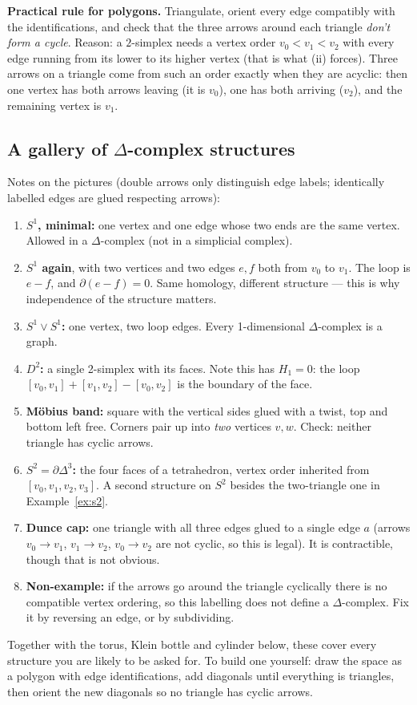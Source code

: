 \documentclass[11pt]{article}
\newcommand{\fig}[2]{\begin{center}\resizebox{#2}{!}{}\end{center}}
\theoremstyle{definition}
\begin{document}
\textbf{Practical rule for polygons.} Triangulate, orient every edge compatibly with the identifications, and check that the three arrows around each triangle \emph{don't form a cycle}. Reason: a $2$-simplex needs a vertex order $v_0<v_1<v_2$ with every edge running from its lower to its higher vertex (that is what (ii) forces). Three arrows on a triangle come from such an order exactly when they are acyclic: then one vertex has both arrows leaving (it is $v_0$), one has both arriving ($v_2$), and the remaining vertex is $v_1$.

\subsection{A gallery of $\Delta$-complex structures}
\fig{delta-gallery}{\textwidth}
Notes on the pictures (double arrows only distinguish edge labels; identically labelled edges are glued respecting arrows):
\begin{enumerate}
\item \textbf{$S^1$, minimal:} one vertex and one edge whose two ends are the same vertex. Allowed in a $\Delta$-complex (not in a simplicial complex).
\item \textbf{$S^1$ again}, with two vertices and two edges $e,f$ both from $v_0$ to $v_1$. The loop is $e-f$, and $\partial(e-f)=0$. Same homology, different structure --- this is why independence of the structure matters.
\item \textbf{$S^1\vee S^1$:} one vertex, two loop edges. Every 1-dimensional $\Delta$-complex is a graph.
\item \textbf{$D^2$:} a single 2-simplex with its faces. Note this has $H_1=0$: the loop $[v_0,v_1]+[v_1,v_2]-[v_0,v_2]$ is the boundary of the face.
\item \textbf{Möbius band:} square with the vertical sides glued with a twist, top and bottom left free. Corners pair up into \emph{two} vertices $v,w$. Check: neither triangle has cyclic arrows.
\item \textbf{$S^2=\partial\Delta^3$:} the four faces of a tetrahedron, vertex order inherited from $[v_0,v_1,v_2,v_3]$. A second structure on $S^2$ besides the two-triangle one in Example~\ref{ex:s2}.
\item \textbf{Dunce cap:} one triangle with all three edges glued to a single edge $a$ (arrows $v_0\to v_1$, $v_1\to v_2$, $v_0\to v_2$ are not cyclic, so this is legal). It is contractible, though that is not obvious.
\item \textbf{Non-example:} if the arrows go around the triangle cyclically there is no compatible vertex ordering, so this labelling does not define a $\Delta$-complex. Fix it by reversing an edge, or by subdividing.
\end{enumerate}
Together with the torus, Klein bottle and cylinder below, these cover every structure you are likely to be asked for. To build one yourself: draw the space as a polygon with edge identifications, add diagonals until everything is triangles, then orient the new diagonals so no triangle has cyclic arrows.
\end{document}
